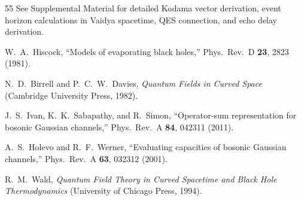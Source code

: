 \documentclass[prl,twocolumn,superscriptaddress,longbibliography,floatfix]{revtex4-2}
\begin{document}
\begin{thebibliography}{55}
See Supplemental Material for detailed Kodama vector
derivation, event horizon calculations in Vaidya
spacetime, QES connection, and echo delay derivation.

W.~A.~Hiscock,
``Models of evaporating black holes,''
Phys.\ Rev.\ D \textbf{23}, 2823 (1981).

N.~D.~Birrell and P.~C.~W.~Davies,
\emph{Quantum Fields in Curved Space}
(Cambridge University Press, 1982).

J.~S.~Ivan, K.~K.~Sabapathy, and R.~Simon,
``Operator-sum representation for bosonic Gaussian channels,''
Phys.\ Rev.\ A \textbf{84}, 042311 (2011).

A.~S.~Holevo and R.~F.~Werner,
``Evaluating capacities of bosonic Gaussian channels,''
Phys.\ Rev.\ A \textbf{63}, 032312 (2001).

R.~M.~Wald,
\emph{Quantum Field Theory in Curved Spacetime and
Black Hole Thermodynamics}
(University of Chicago Press, 1994).

\end{thebibliography}
\end{document}
